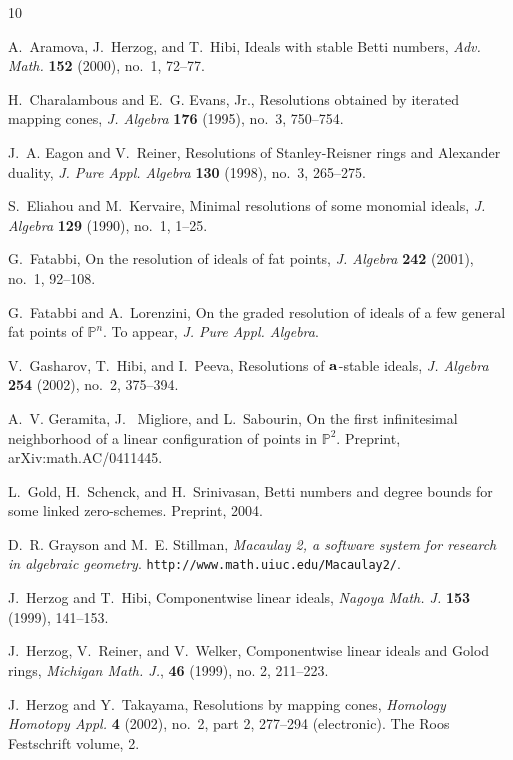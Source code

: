 \documentclass{article}
\begin{document}
\providecommand{\bysame}{\leavevmode\hbox to3em{\hrulefill}\thinspace}
\begin{thebibliography}{10}

A.~Aramova, J.~Herzog, and T.~Hibi,  Ideals with stable {B}etti numbers,
  \emph{Adv. Math.} \textbf{152} (2000), no.~1, 72--77.

H.~Charalambous and E.~G. Evans, Jr.,  Resolutions obtained by iterated mapping
  cones, \emph{J. Algebra} \textbf{176} (1995), no.~3, 750--754.

J.~A. Eagon and V.~Reiner,  Resolutions of {S}tanley-{R}eisner rings and
  {A}lexander duality, \emph{J. Pure Appl. Algebra} \textbf{130} (1998), no.~3,
  265--275.

S.~Eliahou and M.~Kervaire,  Minimal resolutions of some monomial ideals,
  \emph{J. Algebra} \textbf{129} (1990), no.~1, 1--25.

G.~Fatabbi,  On the resolution of ideals of fat points, \emph{J. Algebra}
  \textbf{242} (2001), no.~1, 92--108.

G.~Fatabbi and A.~Lorenzini,  On the graded resolution of ideals of a few
  general fat points of {$\mathbb P^n$}.
\newblock To appear, \emph{J. Pure Appl. Algebra}.

V.~Gasharov, T.~Hibi, and I.~Peeva,  Resolutions of {$\bold a$}-stable ideals,
  \emph{J. Algebra} \textbf{254} (2002), no.~2, 375--394.

A.~V. Geramita, J.~ Migliore, and L.~Sabourin, On the first infinitesimal neighborhood of a linear configuration of points in $\mathbb{P}^2.$ Preprint, arXiv:math.AC/0411445.

L.~Gold, H.~Schenck, and H.~Srinivasan,  {B}etti numbers and degree bounds for
  some linked zero-schemes.
\newblock Preprint, 2004.

D.~R. Grayson and M.~E. Stillman, \emph{Macaulay 2, a software system for
  research in algebraic geometry}.
\newblock \verb|http://www.math.uiuc.edu/Macaulay2/|.

J.~Herzog and T.~Hibi,  Componentwise linear ideals, \emph{Nagoya Math. J.}
  \textbf{153} (1999), 141--153.

J.~Herzog, V.~Reiner, and V.~Welker, Componentwise linear ideals and Golod rings, \emph{Michigan Math. J.}, \textbf{46} (1999), no. 2, 211--223.

J.~Herzog and Y.~Takayama,  Resolutions by mapping cones, \emph{Homology
  Homotopy Appl.} \textbf{4} (2002), no.~2, part 2, 277--294 (electronic).
\newblock The Roos Festschrift volume, 2.


\end{thebibliography}
\end{document}
